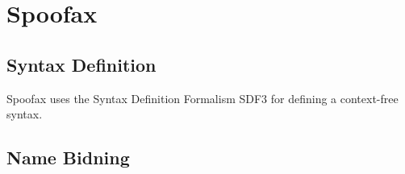 \section{Spoofax}

\subsection{Syntax Definition}

Spoofax uses the Syntax Definition Formalism SDF3 for defining a context-free syntax.



\subsection{Name Bidning}










